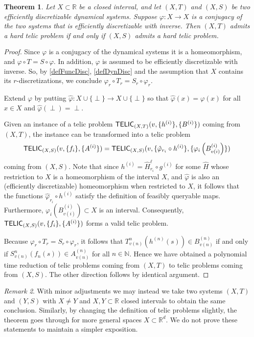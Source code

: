 \documentclass{amsart}
\theoremstyle{theorem}
\newtheorem{theorem}{Theorem}[section]
\theoremstyle{remark}
\newtheorem{remark}[theorem]{Remark}
\numberwithin{equation}{section}
\newcommand{\NN}{\mathbb{N}}
\newcommand{\RR}{\mathbb{R}}
\newcommand{\ccTELIC}{\textsf{\upshape TELIC}}
\begin{document}
\begin{theorem}\label{thmConjugacyHardness}
Let $X \subset \RR$ be a closed interval, and let $(X, T)$ and $(X, S)$ be two efficiently discretizable dynamical systems.
Suppose $\varphi:X\rightarrow X$ is a conjugacy of the two systems that is efficiently discretizable with inverse.
Then $(X, T)$ admits a hard telic problem if and only if $(X, S)$ admits a hard telic problem.
\end{theorem}
\begin{proof}
Since $\varphi$ is a conjugacy of the dynamical systems it is a homeomorphism, and $\varphi\circ T = S \circ \varphi$. In addition, $\varphi$ is assumed to be efficiently discretizable with inverse.
So, by \cref{defFuncDisc}, \cref{defDynDisc} and the assumption that $X$ contains its $r$-discretizations, we conclude $\varphi_r\circ T_r = S_r \circ \varphi_r$.

Extend $\varphi$ by putting $\hat{\varphi}:X\cup \{\perp\}\rightarrow X\cup\{\perp\}$ so that $\hat{\varphi}(x) = \varphi(x)$ for all $x \in X$ and $\hat{\varphi}(\perp) = \perp$.

Given an instance of a telic problem $\ccTELIC_{(X, T)}(v, \{h^{(i)}\}, \{B^{(i)}\})$ coming from $(X, T)$, the instance can be transformed into a telic problem 
\[
\ccTELIC_{(X, S)}(v, \{f_i\}, \{A^{(i)}\}) = \ccTELIC_{(X, S)}(v, \{\hat{\varphi}_{r_i}\circ h^{(i)}\}, \{\varphi_{i}\left(B^{(i)}_{v(i)}\right)\})
\]
coming from $(X, S)$.
Note that since $h^{(i)} = \hat{H}^\ell_{r_i} \circ g^{(i)}$ for some $\hat{H}$ whose restriction to $X$ is a homeomorphism of the interval $X$, and $\hat{\varphi}$ is also an (efficiently discretizable) homeomorphism when restricted to $X$, it follows that the functions $\hat{\varphi}_{r_i}\circ h^{(i)}$ satisfy the definition of feasibly queryable maps. Furthermore, $\varphi_{i}\left(B^{(i)}_{v(i)}\right) \subset X$ is an interval. Consequently, $\ccTELIC_{(X, S)}(v, \{f_i\}, \{A^{(i)}\})$ forms a valid telic problem.

Because $\varphi_r\circ T_r = S_r \circ \varphi_r$, it follows that $T^{n}_{v(n)}(h^{(n)}(s)) \in B^{(n)}_{v(n)}$ if and only if $S^{n}_{v(n)}(f_n(s)) \in A^{(n)}_{v(n)}$ for all $n \in\NN$.
Hence we have obtained a polynomial time reduction of telic problems coming from $(X, T)$ to telic problems coming from $(X, S)$. The other direction follows by identical argument.
\end{proof}

\begin{remark}
With minor adjustments we may instead we take two systems $(X, T)$ and $(Y, S)$ with $X \neq Y$ and $X, Y \subset \RR$ closed intervals to obtain the same conclusion.
Similarly, by changing the definition of telic problems slightly, the theorem goes through for more general spaces $X \subset \RR^d$.
We do not prove these statements to maintain a simpler exposition.
\end{remark}
\end{document}
